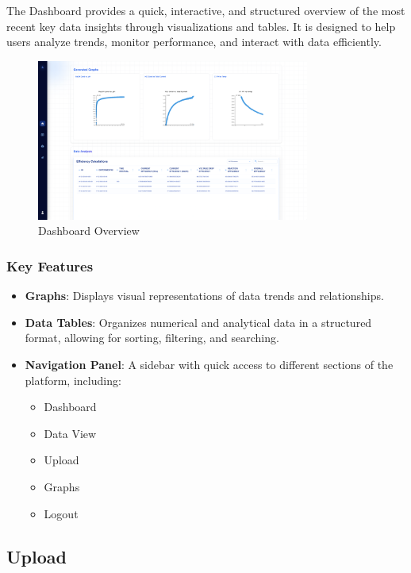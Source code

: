 \documentclass[12pt]{article}
\begin{document}
The Dashboard provides a quick, interactive, and structured overview of the most
recent key data insights through visualizations and tables. It is designed to
help users analyze trends, monitor performance, and interact with data
efficiently.

\begin{figure}[H]
    \centering
    \includegraphics[width=0.8\textwidth]{./Diagrams/Dashboard.png}
    \caption{Dashboard Overview}
\end{figure}


\subsubsection{Key Features}
\begin{itemize}
    \item \textbf{Graphs}: Displays visual representations of data trends and
    relationships.
    \item \textbf{Data Tables}: Organizes numerical and analytical data in a
    structured format, allowing for sorting, filtering, and searching.
    \item \textbf{Navigation Panel}: A sidebar with quick access to different
    sections of the platform, including:
    \begin{itemize}
        \item Dashboard
        \item Data View
        \item Upload
        \item Graphs
        \item Logout
    \end{itemize}
\end{itemize}

\subsection{Upload}
\end{document}
